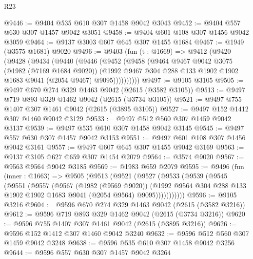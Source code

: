 \begin{lexlean}{R23}
\begin{coremodule}
@9446 := @9404 @535 @610 @307 @1458 @9042 @3043
@9452 := @9404 @557 @630 @307 @1457 @9042 @3051
@9458 := @9404 @601 @108 @307 @1456 @9042 @3059
@9464 := @9137 @3003 @607 @645 @307 @1455 @1684
@9467 := @1949 (@3575 @1681) @9020
@9496 := @9403
    (fun (t : @1669) =>
    @9412
      (@9420
        (@9428
          (@9434
            (@9440
              (@9446
                (@9452
                  (@9458
                    (@9464
                      @9467
                      @9042
                      @3075
                      (@1982 (@7169 @1684 @9020))
                      (@1992
                        @9467
                        @304
                        @288
                        @133
                        @1902
                        @1902
                        @1683
                        @9041
                        (@2054 @9467)
                        @9095))))))))))
@9497 := @9105 @3105
@9505 := @9497 @670 @274 @329 @1463 @9042 (@2615 (@3582 @3105))
@9513 := @9497 @719 @893 @329 @1462 @9042 (@2615 (@3734 @3105))
@9521 := @9497 @755 @1407 @307 @1461 @9042 (@2615 (@3895 @3105))
@9527 := @9497 @152 @1412 @307 @1460 @9042 @3129
@9533 := @9497 @512 @560 @307 @1459 @9042 @3137
@9539 := @9497 @535 @610 @307 @1458 @9042 @3145
@9545 := @9497 @557 @630 @307 @1457 @9042 @3153
@9551 := @9497 @601 @108 @307 @1456 @9042 @3161
@9557 := @9497 @607 @645 @307 @1455 @9042 @3169
@9563 := @9137 @3105 @627 @659 @307 @1454 @2079
@9564 := @3574 @9020
@9567 := @9563 @9564 @9042 @3185
@9569 := @1983 @659 @2079
@9595 := @9496
    (fun (inner : @1663) =>
    @9505
      (@9513
        (@9521
          (@9527
            (@9533
              (@9539
                (@9545
                  (@9551
                    (@9557
                      (@9567
                        (@1982 (@9569 @9020))
                        (@1992
                          @9564
                          @304
                          @288
                          @133
                          @1902
                          @1902
                          @1683
                          @9041
                          (@2054 @9564)
                          @9095)))))))))))
@9596 := @9105 @3216
@9604 := @9596 @670 @274 @329 @1463 @9042 (@2615 (@3582 @3216))
@9612 := @9596 @719 @893 @329 @1462 @9042 (@2615 (@3734 @3216))
@9620 := @9596 @755 @1407 @307 @1461 @9042 (@2615 (@3895 @3216))
@9626 := @9596 @152 @1412 @307 @1460 @9042 @3240
@9632 := @9596 @512 @560 @307 @1459 @9042 @3248
@9638 := @9596 @535 @610 @307 @1458 @9042 @3256
@9644 := @9596 @557 @630 @307 @1457 @9042 @3264

\end{coremodule}
\end{lexlean}
